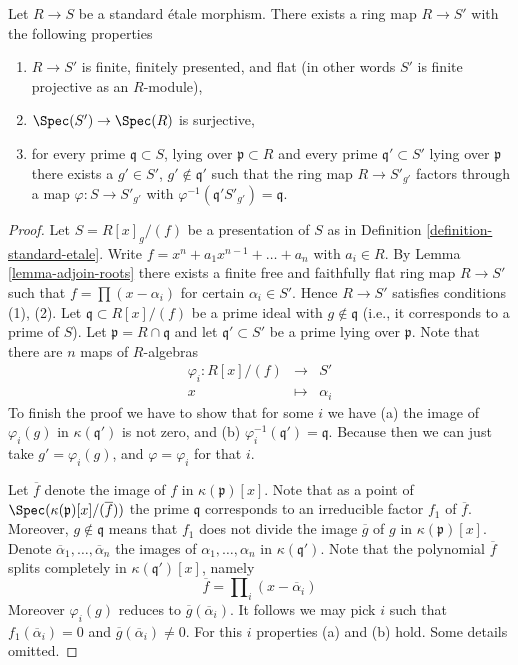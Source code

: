 \begin{lemma}
\label{lemma-standard-etale-finite-flat-Zariski}
Let $R \to S$ be a standard \'etale morphism.
There exists a ring map $R \to S'$ with the following properties
\begin{enumerate}
\item $R \to S'$ is finite, finitely presented, and flat
(in other words $S'$ is finite projective as an $R$-module),
\item $\Spec(S') \to \Spec(R)$ is surjective,
\item for every prime $\mathfrak q \subset S$, lying over
$\mathfrak p \subset R$ and every prime
$\mathfrak q' \subset S'$ lying over $\mathfrak p$ there exists
a $g' \in S'$, $g' \not \in \mathfrak q'$
such that the ring map $R \to S'_{g'}$ factors
through a map $\varphi : S \to S'_{g'}$ with
$\varphi^{-1}(\mathfrak q'S'_{g'}) = \mathfrak q$.
\end{enumerate}
\end{lemma}

\begin{proof}
Let $S = R[x]_g/(f)$ be a presentation of $S$ as in
Definition \ref{definition-standard-etale}.
Write $f = x^n + a_1 x^{n - 1} + \ldots + a_n$ with $a_i \in R$.
By Lemma \ref{lemma-adjoin-roots} there exists a finite free
and faithfully flat ring map $R \to S'$ such that $f = \prod (x - \alpha_i)$
for certain $\alpha_i \in S'$. Hence $R \to S'$ satisfies conditions (1), (2).
Let $\mathfrak q \subset R[x]/(f)$ be a prime ideal with
$g \not \in \mathfrak q$ (i.e., it corresponds to a prime of $S$).
Let $\mathfrak p = R \cap \mathfrak q$ and let
$\mathfrak q' \subset S'$ be a prime lying over $\mathfrak p$.
Note that there are
$n$ maps of $R$-algebras
\begin{eqnarray*}
\varphi_i : R[x]/(f) & \longrightarrow & S' \\
x & \longmapsto & \alpha_i
\end{eqnarray*}
To finish the proof we have to show that for some $i$ we have
(a) the image of $\varphi_i(g)$ in $\kappa(\mathfrak q')$ is not zero,
and (b) $\varphi_i^{-1}(\mathfrak q') = \mathfrak q$.
Because then we can just take $g' = \varphi_i(g)$, and
$\varphi = \varphi_i$ for that $i$.

\medskip\noindent
Let $\overline{f}$ denote the image of $f$ in $\kappa(\mathfrak p)[x]$.
Note that as a point of $\Spec(\kappa(\mathfrak p)[x]/(\overline{f}))$
the prime $\mathfrak q$ corresponds to an irreducible factor
$f_1$ of $\overline{f}$. Moreover, $g \not \in \mathfrak q$ means
that $f_1$ does not divide the image $\overline{g}$ of $g$ in
$\kappa(\mathfrak p)[x]$.
Denote $\overline{\alpha}_1, \ldots, \overline{\alpha}_n$ the images
of $\alpha_1, \ldots, \alpha_n$ in $\kappa(\mathfrak q')$.
Note that the polynomial $\overline{f}$ splits completely
in $\kappa(\mathfrak q')[x]$, namely
$$
\overline{f} = \prod\nolimits_i (x - \overline{\alpha}_i)
$$
Moreover $\varphi_i(g)$ reduces to $\overline{g}(\overline{\alpha}_i)$.
It follows we may pick $i$ such that $f_1(\overline{\alpha}_i) = 0$ and
$\overline{g}(\overline{\alpha}_i) \not = 0$.
For this $i$ properties (a) and (b) hold. Some details omitted.
\end{proof}
